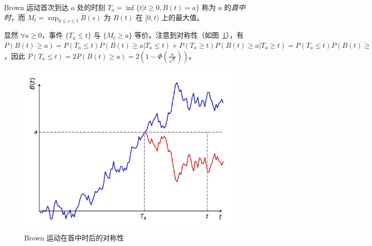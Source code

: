 \documentclass[../main.tex]{subfiles}
\begin{document}
Brown 运动首次到达 $a$ 处的时刻 $T_a=\inf\{t|t\geq0,B(t)=a\}$ 称为 $a$ 的\emph{首中时}，而 $M_t=\sup_{0\leq s\leq t}B(s)$ 为 $B(t)$ 在 $[0,t)$ 上的最大值。

显然 $\forall a\geq 0$，事件 $\{T_a\leq t\}$ 与 $\{M_t\geq a\}$ 等价。注意到对称性（如图~\ref{fig:8.3.1}），有 $P(B(t)\geq a)=P(T_a\leq t)P(B(t)\geq a|T_a\leq t)+P(T_a\geq t)P(B(t)\geq a|T_a\geq t)=P(T_a\leq t)P(B(t)\geq a|T_a\leq t)=\frac12P(T_a\leq t)$，因此 $P(T_a\leq t)=2P(B(t)\geq a)=2(1-\Phi(\frac a{\sqrt t}))$。

\begin{figure}[!h]
    \centering
    \includegraphics{figures/brownian_motion_symmetry.png}
    \caption{Brown 运动在首中时后的对称性}
    \label{fig:8.3.1}
\end{figure}
\end{document}
